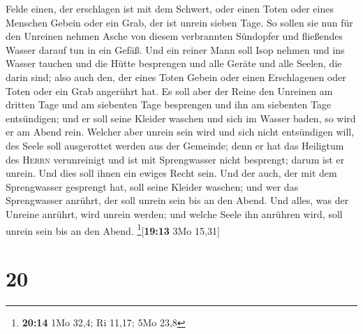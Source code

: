 Felde einen, der erschlagen ist mit dem Schwert, oder einen Toten oder
eines Menschen Gebein oder ein Grab, der ist unrein sieben Tage.
 So sollen sie nun für den Unreinen nehmen Asche von
diesem verbrannten Sündopfer und fließendes Wasser darauf tun in ein
Gefäß.  Und ein reiner Mann soll Isop nehmen und ins
Wasser tauchen und die Hütte besprengen und alle Geräte und alle Seelen,
die darin sind; also auch den, der eines Toten Gebein oder einen
Erschlagenen oder Toten oder ein Grab angerührt hat.  Es
soll aber der Reine den Unreinen am dritten Tage und am siebenten Tage
besprengen und ihn am siebenten Tage entsündigen; und er soll seine
Kleider waschen und sich im Wasser baden, so wird er am Abend rein.
 Welcher aber unrein sein wird und sich nicht entsündigen
will, des Seele soll ausgerottet werden aus der Gemeinde; denn er hat
das Heiligtum des \textsc{Herrn} verunreinigt und ist mit Sprengwasser
nicht besprengt; darum ist er unrein.  Und dies soll
ihnen ein ewiges Recht sein. Und der auch, der mit dem Sprengwasser
gesprengt hat, soll seine Kleider waschen; und wer das Sprengwasser
anrührt, der soll unrein sein bis an den Abend.  Und
alles, was der Unreine anrührt, wird unrein werden; und welche Seele ihn
anrühren wird, soll unrein sein bis an den Abend.
\footnote{\textbf{20:14} 1Mo 32,4; Ri 11,17; 5Mo 23,8}{[}\textbf{19:13}
3Mo 15,31{]}

\hypertarget{section-19}{%
\section{20}\label{section-19}}


